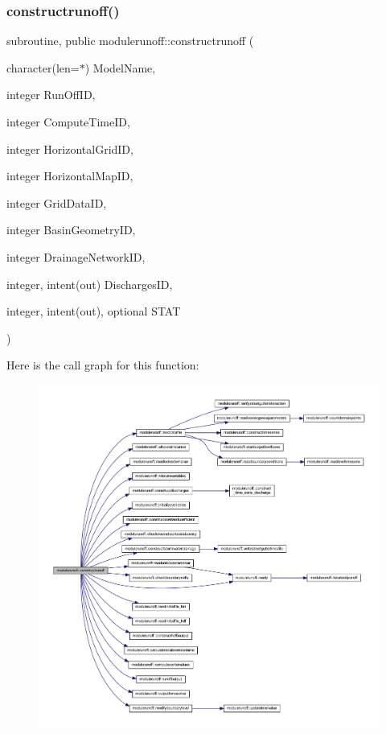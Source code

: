 \subsubsection{\texorpdfstring{constructrunoff()}{constructrunoff()}}
{\footnotesize\ttfamily subroutine, public modulerunoff\+::constructrunoff (\begin{DoxyParamCaption}\item[{character(len=$\ast$)}]{Model\+Name,  }\item[{integer}]{Run\+Off\+ID,  }\item[{integer}]{Compute\+Time\+ID,  }\item[{integer}]{Horizontal\+Grid\+ID,  }\item[{integer}]{Horizontal\+Map\+ID,  }\item[{integer}]{Grid\+Data\+ID,  }\item[{integer}]{Basin\+Geometry\+ID,  }\item[{integer}]{Drainage\+Network\+ID,  }\item[{integer, intent(out)}]{Discharges\+ID,  }\item[{integer, intent(out), optional}]{S\+T\+AT }\end{DoxyParamCaption})}

Here is the call graph for this function\+:
\nopagebreak
\begin{figure}[H]
\begin{center}
\leavevmode
\includegraphics[width=350pt]{namespacemodulerunoff_afd5b620864c9f62a5b0258956c609766_cgraph}
\end{center}
\end{figure}
\mbox{\label{namespacemodulerunoff_a03335615cccffdf4fcbc7979c2e2b299}} 
